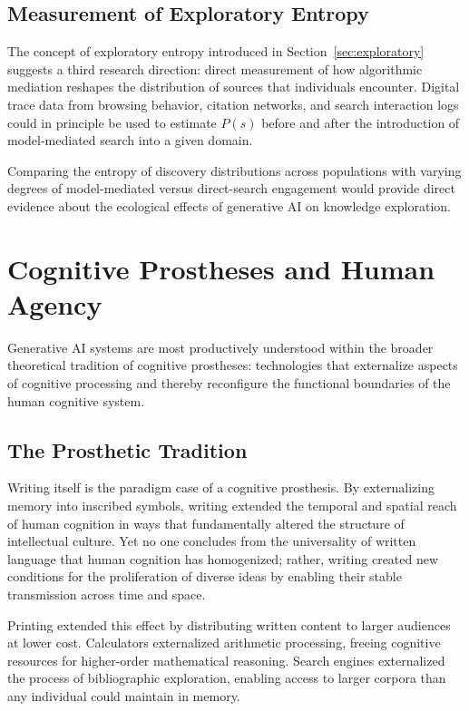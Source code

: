 \documentclass[12pt,a4paper]{article}
\theoremstyle{definition}
\theoremstyle{plain}
\theoremstyle{remark}
\begin{document}
\subsection{Measurement of Exploratory Entropy}

The concept of exploratory entropy introduced in Section~\ref{sec:exploratory} suggests a
third research direction: direct measurement of how algorithmic mediation reshapes the
distribution of sources that individuals encounter. Digital trace data from browsing behavior,
citation networks, and search interaction logs could in principle be used to estimate $P(s)$
before and after the introduction of model-mediated search into a given domain.

Comparing the entropy of discovery distributions across populations with varying degrees of
model-mediated versus direct-search engagement would provide direct evidence about the
ecological effects of generative AI on knowledge exploration.

\section{Cognitive Prostheses and Human Agency}
\label{sec:prostheses}

Generative AI systems are most productively understood within the broader theoretical
tradition of cognitive prostheses: technologies that externalize aspects of cognitive
processing and thereby reconfigure the functional boundaries of the human cognitive system.

\subsection{The Prosthetic Tradition}

Writing itself is the paradigm case of a cognitive prosthesis. By externalizing memory into
inscribed symbols, writing extended the temporal and spatial reach of human cognition in ways
that fundamentally altered the structure of intellectual culture. Yet no one concludes from
the universality of written language that human cognition has homogenized; rather, writing
created new conditions for the proliferation of diverse ideas by enabling their stable
transmission across time and space.

Printing extended this effect by distributing written content to larger audiences at lower
cost. Calculators externalized arithmetic processing, freeing cognitive resources for
higher-order mathematical reasoning. Search engines externalized the process of bibliographic
exploration, enabling access to larger corpora than any individual could maintain in memory.
\end{document}
